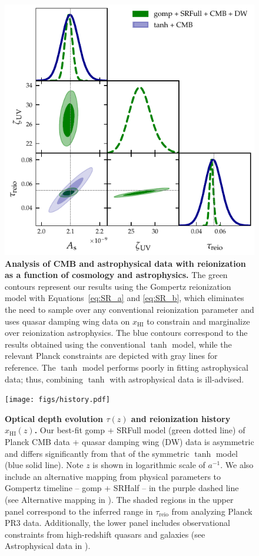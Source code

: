 \documentclass[12pt]{article}
\newcommand{\HI}{\mathrm{HI}}
\newcommand{\reio}{\mathrm{reio}}
\begin{document}
\begin{figure}
\centering
\includegraphics[width=0.6\linewidth]{figs/gomp1dw_tanh_triangle_kill.pdf}
\caption{\textbf{Analysis of CMB and astrophysical data with
reionization as a function of cosmology and astrophysics.}
The green contours represent our results using the Gompertz reionization
model with Equations~\eqref{eq:SR_a} and \eqref{eq:SR_b}, which eliminates the need to sample
over any conventional reionization parameter and uses quasar damping
wing data on $x_\HI$ to constrain and marginalize over reionization
astrophysics.
The blue contours correspond to the results obtained using the
conventional $\tanh$ model, while the relevant Planck constraints
\cite{Planck2020a} are depicted with gray lines for reference.
The $\tanh$ model performs poorly in fitting astrophysical data; thus,
combining $\tanh$ with astrophysical data is ill-advised.}
\label{fig:kill}
\end{figure}

\begin{figure}
\centering
\texttt{[image: figs/history.pdf]}
\caption{\textbf{\boldmath Optical depth evolution $\tau(z)$ and reionization
history $x_\HI(z)$.}
Our best-fit gomp + SRFull model (green dotted line) of Planck CMB data
+ quasar damping wing (DW) data is asymmetric and differs significantly
from that of the symmetric $\tanh$ model (blue solid line).
Note $z$ is shown in logarithmic scale of $a^{-1}$.
We also include an alternative mapping from physical parameters to
Gompertz timeline -- gomp + SRHalf -- in the purple dashed line (see
Alternative mapping in \cite{methods}).
The shaded regions in the upper panel correspond to the inferred range
in $\tau_\reio$ from analyzing Planck PR3 data.
Additionally, the lower panel includes observational constraints from
high-redshift quasars and galaxies (see Astrophysical data in
\cite{methods}).}
\label{fig:history} \end{figure}
\end{document}
